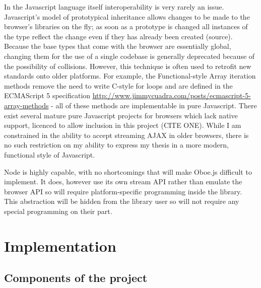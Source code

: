 \documentclass[]{article}
\let\stdsection\section
\renewcommand\section{\newpage\stdsection}
\begin{document}
In the Javascript language itself interoperability is very rarely an
issue. Javascript's model of prototypical inheritance allows changes to
be made to the browser's libraries on the fly; as soon as a prototype is
changed all instances of the type reflect the change even if they has
already been created (source). Because the base types that come with the
browser are essentially global, changing them for the use of a single
codebase is generally deprecated because of the possibility of
collisions. However, this technique is often used to retrofit new
standards onto older platforms. For example, the Functional-style Array
iteration methods remove the need to write C-style for loops and are
defined in the ECMAScript 5 specification
\url{http://www.jimmycuadra.com/posts/ecmascript-5-array-methods} - all
of these methods are implementable in pure Javascript. There exist
several mature pure Javascript projects for browsers which lack native
support, licenced to allow inclusion in this project (CITE ONE). While I
am constrained in the ability to accept streaming AJAX in older
browsers, there is no such restriction on my ability to express my
thesis in a more modern, functional style of Javascript.

Node is highly capable, with no shortcomings that will make Oboe.js
difficult to implement. It does, however use its own stream API rather
than emulate the browser API so will require platform-specific
programming inside the library. This abstraction will be hidden from the
library user so will not require any special programming on their part.

\section{Implementation}

\subsection{Components of the project}
\end{document}
